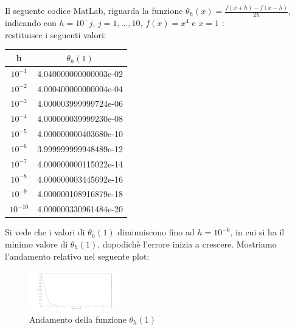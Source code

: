 Il seguente codice MatLab, riguarda la funzione $\theta_{h}(x) = \frac{f(x+h)-f(x-h)}{2h}$, indicando con $h=10^-j$, $j=1,...,10$, $f(x)=x^4$ e $x=1$ :\\
	
restituisce i seguenti valori:\\
\begin{center}
	\begin{tabular}{|c|c|}
		\hline
			h & \( \theta_{h}(1) \)  \\
		\hline
    		\(10^{-1}\) & 4.040000000000003e-02\\
    		\(10^{-2}\) & 4.000400000000004e-04\\
    		\(10^{-3}\) & 4.000003999999724e-06\\
    		\(10^{-4}\) & 4.000000039999230e-08\\
    		\(10^{-5}\) & 4.000000000403680e-10\\
    		\(10^{-6}\) & 3.999999999948489e-12\\
    		\(10^{-7}\) & 4.000000000115022e-14\\
    		\(10^{-8}\) & 4.000000003445692e-16\\
    		\(10^{-9}\) & 4.000000108916879e-18\\
    		\(10^{-10}\) & 4.000000330961484e-20\\
		\hline
	\end{tabular}
\end{center} 
Si vede che i valori di $\theta_{h}(1)$ diminuiscono fino ad $h = 10^{-6}$, in cui si ha il minimo valore di $\theta_{h}(1)$, dopodichè l'errore inizia a crescere. Mostriamo l'andamento relativo nel seguente plot:
\begin{figure}[H]
	\label{Cap_1_Es_3}
	\includegraphics[left, width=150px]{Plot/Cap_1_Es_3}
		\caption{Andamento della funzione $\theta_{h}(1)$}
\end{figure}